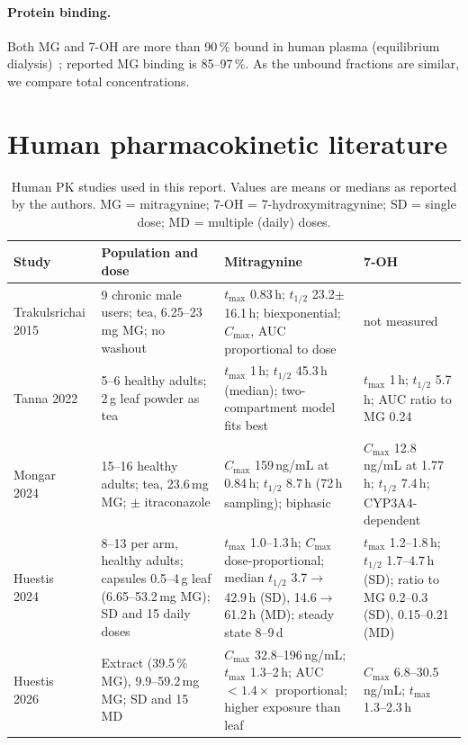 \documentclass[10pt,a4paper]{article}
\begin{document}
\paragraph{Protein binding.} Both MG and 7-OH are more than 90\,\% bound in human plasma (equilibrium dialysis)~\cite{manda2014};
reported MG binding is 85--97\,\%. As the unbound fractions are similar, we compare total concentrations.

\section{Human pharmacokinetic literature}

\begin{table}[H]\centering\small
\caption{Human PK studies used in this report. Values are means or medians as reported by the authors.
MG = mitragynine; 7-OH = 7-hydroxymitragynine; SD = single dose; MD = multiple (daily) doses.}
\label{tab:lit}
\begin{tabular}{@{}p{2.6cm}p{3.6cm}p{4.6cm}p{4.2cm}@{}}
\toprule
Study & Population and dose & Mitragynine & 7-OH \\
\midrule
Trakulsrichai 2015~\cite{trak2015} & 9 chronic male users; tea, 6.25--23\,mg MG; no washout & $t_{\max}$ 0.83\,h; $t_{1/2}$ 23.2$\pm$16.1\,h; biexponential; $C_{\max}$, AUC proportional to dose & not measured \\
Tanna 2022~\cite{tanna2022} & 5--6 healthy adults; 2\,g leaf powder as tea & $t_{\max}$ 1\,h; $t_{1/2}$ 45.3\,h (median); two-compartment model fits best & $t_{\max}$ 1\,h; $t_{1/2}$ 5.7\,h; AUC ratio to MG 0.24 \\
Mongar 2024~\cite{mongar2024} & 15--16 healthy adults; tea, 23.6\,mg MG; $\pm$ itraconazole & $C_{\max}$ 159\,ng/mL at 0.84\,h; $t_{1/2}$ 8.7\,h (72\,h sampling); biphasic & $C_{\max}$ 12.8\,ng/mL at 1.77\,h; $t_{1/2}$ 7.4\,h; CYP3A4-dependent \\
Huestis 2024~\cite{huestis2024} & 8--13 per arm, healthy adults; capsules 0.5--4\,g leaf (6.65--53.2\,mg MG); SD and 15 daily doses & $t_{\max}$ 1.0--1.3\,h; $C_{\max}$ dose-proportional; median $t_{1/2}$ 3.7$\to$42.9\,h (SD), 14.6$\to$61.2\,h (MD); steady state 8--9\,d & $t_{\max}$ 1.2--1.8\,h; $t_{1/2}$ 1.7--4.7\,h (SD); ratio to MG 0.2--0.3 (SD), 0.15--0.21 (MD) \\
Huestis 2026~\cite{huestis2026} & Extract (39.5\,\% MG), 9.9--59.2\,mg MG; SD and 15 MD & $C_{\max}$ 32.8--196\,ng/mL; $t_{\max}$ 1.3--2\,h; AUC $<1.4\times$ proportional; higher exposure than leaf & $C_{\max}$ 6.8--30.5\,ng/mL; $t_{\max}$ 1.3--2.3\,h \\

\end{tabular}
\end{table}
\end{document}
